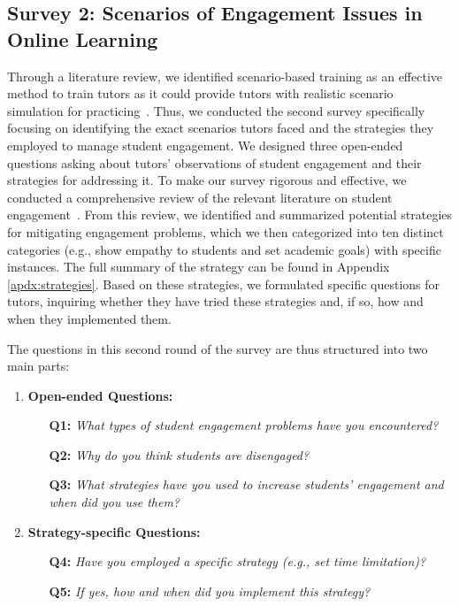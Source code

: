 \subsection{Survey 2: Scenarios of Engagement Issues in Online Learning}
\label{subsec:survey2}

Through a literature review, we identified scenario-based training as an effective method to train tutors as it could provide tutors with realistic scenario simulation for practicing~\cite{teachingearly, prospectsforchange}. Thus, we conducted the second survey specifically focusing on identifying the exact scenarios tutors faced and the strategies they employed to manage student engagement. We designed three open-ended questions asking about tutors' observations of student engagement and their strategies for addressing it. To make our survey rigorous and effective, we conducted a comprehensive review of the relevant literature on student engagement~\cite{abou2021emergency,motivation,enhancing,sevenprinciples,casestudy}. From this review, we identified and summarized potential strategies for mitigating engagement problems, which we then categorized into ten distinct categories (e.g., show empathy to students and set academic goals) with specific instances. The full summary of the strategy can be found in Appendix \ref{apdx:strategies}. Based on these strategies, we formulated specific questions for tutors, inquiring whether they have tried these strategies and, if so, how and when they implemented them.

The questions in this second round of the survey are thus structured into two main parts:
\begin{enumerate}
    \item \textbf{Open-ended Questions:}
    \begin{enumerate}%
        \item[\textbf{Q1:}] \textit{What types of student engagement problems have you encountered?}
        \item[\textbf{Q2:}] \textit{Why do you think students are disengaged?}
        \item[\textbf{Q3:}] \textit{What strategies have you used to increase students' engagement and when did you use them?}
    \end{enumerate}
    \item \textbf{Strategy-specific Questions:}
    \begin{enumerate}%
        \item[\textbf{Q4:}] \textit{Have you employed a specific strategy (e.g., set time limitation)?}
        \item[\textbf{Q5:}] \textit{If yes, how and when did you implement this strategy?}
    \end{enumerate}
\end{enumerate}


